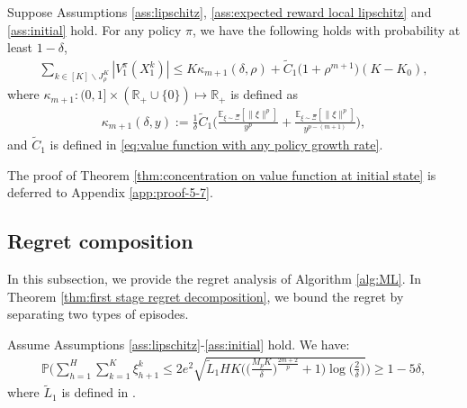 \documentclass[final,supplement]{siamart251216}
\begin{document}
\begin{theorem}\label{thm:concentration on value function at initial state}
Suppose Assumptions \ref{ass:lipschitz}, \ref{ass:expected reward local lipschitz} and \ref{ass:initial} hold. For any policy $\pi$, we have the following holds with probability at least $1-\delta$,
\begin{eqnarray}\label{eq:concentration on value function at initial state}
   \sum_{k \in [K]\backslash J_{\rho}^{K}}|V_{1}^{\pi}(X_{1}^{k})|\leq K\kappa_{m+1}(\delta,\rho)+\widetilde{C}_1\Big(1+\rho^{m+1}\Big)(K-K_{0}),
\end{eqnarray}
where $\kappa_{m+1}:(0,1]\times (\mathbb{R}_+\cup\{0\}) \mapsto \mathbb{R}_+$ is defined as
\begin{eqnarray}\label{eq:kappa1 and kappa m+1}
    \kappa_{m+1}(\delta,y):=\frac{1}{\delta}\widetilde{C}_1\Big(\frac{\mathbb{E}_{\xi \sim \Xi}[\|\xi\|^{p}]}{y^p}+ \frac{\mathbb{E}_{\xi \sim \Xi}[\|\xi\|^{p}]}{y^{p-(m+1)}}\Big),
\end{eqnarray} 
and $\widetilde{C}_{1}$ is defined in \eqref{eq:value function with any policy growth rate}.
\end{theorem}

The proof of Theorem \ref{thm:concentration on value function at initial state} is deferred to Appendix \ref{app:proof-5-7}.


\subsection{Regret composition}
In this subsection, we provide the regret analysis of Algorithm \ref{alg:ML}. In Theorem \ref{thm:first stage regret decomposition}, we bound the regret by separating two types of episodes. 
\iffalse
\begin{lemma}
Assume Assumptions \ref{ass:lipschitz}-\ref{ass:initial} hold. We have:
\begin{eqnarray*}
\mathbb{P}\Bigg(\sum_{h=1}^{H}\sum_{k=1}^{K}\xi_{h+1}^{k}\leq 2e^{2}\sqrt{\widetilde{L}_{1}HK\Big(\Big(\frac{M_{p}K}{\delta}\Big)^{\frac{2m+2}{p}} +1\Big)\log\Big(\frac{2}{\delta}\Big)} \Bigg)\geq 1-5\delta, 
\end{eqnarray*}
where $\widetilde{L}_{1}$ is defined in . 
\end{lemma}
\end{document}

